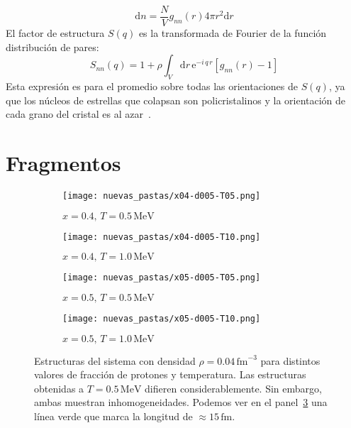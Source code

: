 \begin{equation}
\text{d}n = \frac{N}{V} g_{nn}(r) 4\pi r^2 \text{d}r
\end{equation}
El factor de estructura $S(q)$ es la transformada de Fourier de la función distribución de pares:
\begin{equation}
S_{nn}(q) = 1 + \rho \int_V{\text{d}r\, \text{e}^{-i\,q\,r} \left[g_{nn}(r)
- 1\right]}
\end{equation}
Esta expresión es para el promedio sobre todas las orientaciones de $S(q)$, ya que los núcleos de estrellas que colapsan son policristalinos y la orientación de cada grano del cristal es al azar~\cite{sonoda_impact_2007}.

\section{Fragmentos}\label{sc:clusters}

\begin{figure}[h!]  \centering
  \begin{subfigure}[h!]{0.40\columnwidth}
    \texttt{[image: nuevas\_pastas/x04-d005-T05.png]}
    \caption{$x=0.4,\, T=0.5\,\text{MeV}$}
    \label{subfig:04-05}
  \end{subfigure}
  \begin{subfigure}[h!]{0.40\columnwidth}
    \texttt{[image: nuevas\_pastas/x04-d005-T10.png]}
    \caption{$x=0.4,\, T=1.0\,\text{MeV}$}
    \label{subfig:04-10}
  \end{subfigure}
  \begin{subfigure}[h!]{0.40\columnwidth}
    \texttt{[image: nuevas\_pastas/x05-d005-T05.png]}
    \caption{$x=0.5,\, T=0.5\,\text{MeV}$}
    \label{subfig:05-05}
  \end{subfigure}
  \begin{subfigure}[h!]{0.40\columnwidth}
    \texttt{[image: nuevas\_pastas/x05-d005-T10.png]}
    \caption{$x=0.5,\, T=1.0\,\text{MeV}$}
    \label{subfig:05-10}
  \end{subfigure}
  \caption{Estructuras del sistema con densidad $\rho = 0.04\,\text{fm}^{-3}$ para distintos valores de fracción de protones y temperatura.
    Las estructuras obtenidas a $T=0.5\,\text{MeV}$ difieren considerablemente.
    Sin embargo, ambas muestran inhomogeneidades.
    Podemos ver en el panel~\ref{subfig:05-05} una línea verde que marca la longitud de $\approx 15\,\text{fm}$.}
  \label{fig:morpho}
\end{figure}

